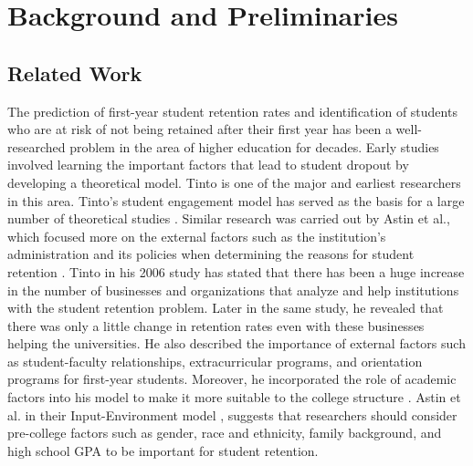 \documentclass[11pt,openright]{report}
\begin{document}
\chapter{Background and Preliminaries} \label{chapter:background}
\section{Related Work}\label{section:relatedwork}

The prediction of first-year student retention rates and identification of students who are at risk of not being retained after their first year has been a well-researched problem in the area of higher education for decades. Early studies involved learning the important factors that lead to student dropout by developing a theoretical model. Tinto is one of the major and earliest researchers in this area. Tinto's student engagement model \cite{tinto1999taking} has served as the basis for a large number of theoretical studies \cite{braxton2002introduction}. Similar research was carried out by Astin et al., which focused more on the external factors such as the institution's administration and its policies when determining the reasons for student retention \cite{astin2012assessment}. Tinto in his 2006 study \cite{tinto2006} has stated that there has been a huge increase in the number of businesses and organizations that analyze and help institutions with the student retention problem. Later in the same study, he revealed that there was only a little change in retention rates even with these businesses helping the universities. He also described the importance of external factors such as student-faculty relationships, extracurricular programs, and orientation programs for first-year students. Moreover, he incorporated the role of academic factors into his model to make it more suitable to the college structure \cite{tinto2006}. Astin et al. in their Input-Environment model \cite{astin2012assessment}, suggests that researchers should consider pre-college factors such as gender, race and ethnicity, family background, and high school GPA  to be important for student retention.
\end{document}
